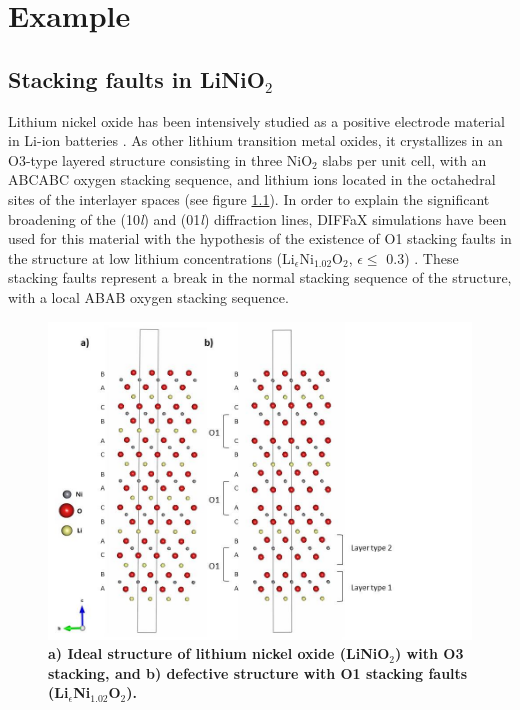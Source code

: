 \chapter{Example}
\label{example}
\setcounter{page}{33}






\section{Stacking faults in LiNiO$_{2}$}

Lithium nickel oxide has been intensively studied as a positive electrode material in Li-ion batteries \cite{Whit2004}.
As other lithium transition metal oxides, it crystallizes in an O3-type layered structure consisting in three NiO$_{2}$ slabs per unit cell, with an ABCABC oxygen stacking sequence, and lithium ions located in the octahedral sites of the interlayer spaces (see figure \ref{estructura}). In order to explain the significant broadening of the (10\emph{l}) and (01\emph{l}) diffraction lines, DIFFaX simulations have been used for this material with the hypothesis of the existence of O1 stacking faults in the structure at low lithium concentrations (Li$_{\epsilon}$Ni$_{1.02}$O$_{2}$, $\epsilon\leq$ 0.3) \cite{Crog2000}. These stacking faults represent a break in the normal stacking sequence of the structure, with a local ABAB oxygen stacking sequence.

\begin{figure}[t]
\begin{center}
\includegraphics [width=5.3 in]{LiNO_estructura.jpg}
\caption{\bf a) Ideal structure of lithium nickel oxide (LiNiO$_{2}$) with O3 stacking, and b) defective structure with O1 stacking faults (Li$_{\epsilon}$Ni$_{1.02}$O$_{2}$).}
\label{estructura}
\end{center}
\end{figure}

